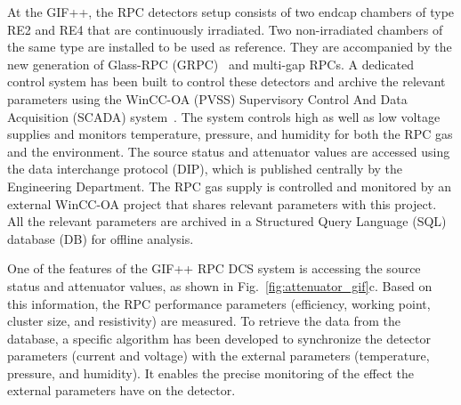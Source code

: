 At the GIF++, the RPC detectors setup consists of two endcap chambers of type RE2 and RE4 that are continuously irradiated. Two non-irradiated chambers of the same type are installed to be used as reference. They are accompanied by the new generation of Glass-RPC (GRPC)~\cite{1748-0221-11-09-C09006} and multi-gap RPCs. A dedicated control system has been built to control these detectors and archive the relevant parameters using the WinCC-OA (PVSS) Supervisory Control And Data Acquisition (SCADA) system~\cite{twiki:wincc-oa}. The system controls high as well as low voltage supplies and monitors temperature, pressure, and humidity for both the RPC gas and the environment. The source status and attenuator values are accessed using the data interchange protocol (DIP), which is published centrally by the Engineering Department. The RPC gas supply is controlled and monitored by an external WinCC-OA project that shares relevant parameters with this project. All the relevant parameters are archived in a Structured Query Language (SQL) database (DB) for offline analysis.

One of the features of the GIF++ RPC DCS system is accessing the source status and attenuator values, as shown in Fig.~\ref{fig:attenuator_gif}c. Based on this information, the RPC performance parameters (efficiency, working point, cluster size, and resistivity) are measured. To retrieve the data from the database, a specific algorithm has been developed to synchronize the detector parameters (current and voltage) with the external parameters (temperature, pressure, and humidity). It enables the precise monitoring of the effect the external parameters have on the detector.
